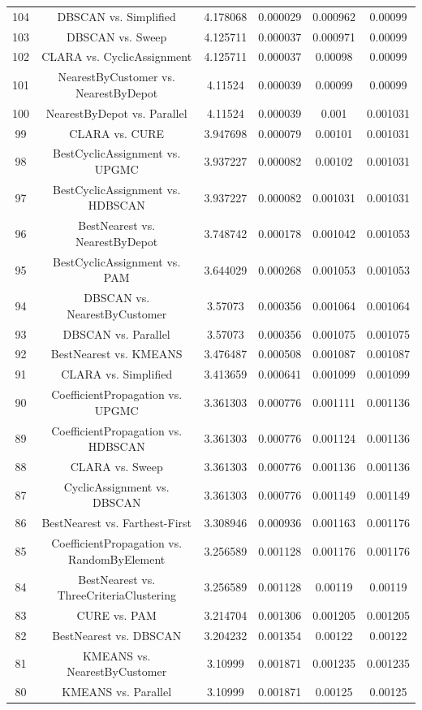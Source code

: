 \documentclass[a4paper,10pt]{article}
\begin{document}
\begin{landscape}
\begin{table}[!htp]
\begin{tabular}{cccccc}
104&DBSCAN vs. Simplified&4.178068&0.000029&0.000962&0.00099\\
103&DBSCAN vs. Sweep&4.125711&0.000037&0.000971&0.00099\\
102&CLARA vs. CyclicAssignment&4.125711&0.000037&0.00098&0.00099\\
101&NearestByCustomer vs. NearestByDepot&4.11524&0.000039&0.00099&0.00099\\
100&NearestByDepot vs. Parallel&4.11524&0.000039&0.001&0.001031\\
99&CLARA vs. CURE&3.947698&0.000079&0.00101&0.001031\\
98&BestCyclicAssignment vs. UPGMC&3.937227&0.000082&0.00102&0.001031\\
97&BestCyclicAssignment vs. HDBSCAN&3.937227&0.000082&0.001031&0.001031\\
96&BestNearest vs. NearestByDepot&3.748742&0.000178&0.001042&0.001053\\
95&BestCyclicAssignment vs. PAM&3.644029&0.000268&0.001053&0.001053\\
94&DBSCAN vs. NearestByCustomer&3.57073&0.000356&0.001064&0.001064\\
93&DBSCAN vs. Parallel&3.57073&0.000356&0.001075&0.001075\\
92&BestNearest vs. KMEANS&3.476487&0.000508&0.001087&0.001087\\
91&CLARA vs. Simplified&3.413659&0.000641&0.001099&0.001099\\
90&CoefficientPropagation vs. UPGMC&3.361303&0.000776&0.001111&0.001136\\
89&CoefficientPropagation vs. HDBSCAN&3.361303&0.000776&0.001124&0.001136\\
88&CLARA vs. Sweep&3.361303&0.000776&0.001136&0.001136\\
87&CyclicAssignment vs. DBSCAN&3.361303&0.000776&0.001149&0.001149\\
86&BestNearest vs. Farthest-First&3.308946&0.000936&0.001163&0.001176\\
85&CoefficientPropagation vs. RandomByElement&3.256589&0.001128&0.001176&0.001176\\
84&BestNearest vs. ThreeCriteriaClustering&3.256589&0.001128&0.00119&0.00119\\
83&CURE vs. PAM&3.214704&0.001306&0.001205&0.001205\\
82&BestNearest vs. DBSCAN&3.204232&0.001354&0.00122&0.00122\\
81&KMEANS vs. NearestByCustomer&3.10999&0.001871&0.001235&0.001235\\
80&KMEANS vs. Parallel&3.10999&0.001871&0.00125&0.00125\\

\end{tabular}
\end{table}
\end{landscape}
\end{document}
